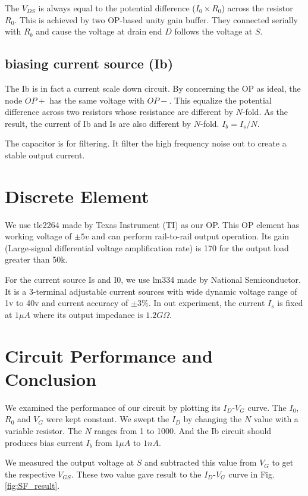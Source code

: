 The $V_{DS}$ is always equal to the potential difference ($I_0 \times R_0$) across the resistor $R_0$.
This is achieved by two OP-based unity gain buffer.
They connected serially with $R_b$ and cause the voltage at drain end $D$ follows the voltage at $S$.


\subsection*{biasing current source (Ib)}
The Ib is in fact a current scale down circuit.
By concerning the OP as ideal, the node $OP+$ has the same voltage with $OP-$.
This equalize the potential difference across two resistors whose resistance are different by $N$-fold.
As the result, the current of Ib and Is are also different by $N$-fold.
$I_b = I_s / N$.

The capacitor is for filtering. It filter the high frequency noise out to create a stable output current.


\section{Discrete Element}
We use tlc2264 made by Texas Instrument (TI) as our OP.
This OP element has working voltage of $\pm 5v$ and can perform rail-to-rail output operation.
Its gain (Large-signal differential voltage amplification rate) is 170 for the output load greater than 50k.

For the current source Is and I0, we use lm334 made by National Semiconductor.
It is a 3-terminal adjustable current sources with wide dynamic voltage range of 1v to 40v and current accuracy of $\pm 3\%$.
In out experiment, the current $I_s$ is fixed at $1\mu A$ where its output impedance is $1.2G\Omega$.

\section{Circuit Performance and Conclusion}
We examined the performance of our circuit by plotting its $I_D$-$V_G$ curve.
The $I_0$, $R_0$ and $V_G$ were kept constant.
We swept the $I_D$ by changing the $N$ value with a variable resistor.
The $N$ ranges from 1 to 1000.
And the Ib circuit should produces bias current $I_b$ from $1\mu A$ to $1n A$.

We measured the output voltage at $S$ and subtracted this value from $V_G$ to get the respective $V_{GS}$.
These two value gave result to the $I_D$-$V_G$ curve in Fig.\ref{fig:SF_result}.

